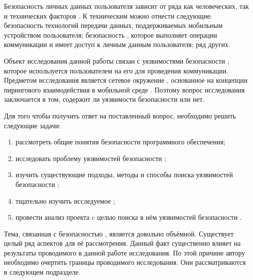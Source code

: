%
Безопасность личных данных пользователя зависит от ряда как человеческих, так и технических факторов .
%
К техническим можно отнести следующие: безопасность технологий передачи данных, поддерживаемых мобильным устройством пользователя; безопасность , которое выполняет операции коммуникации и имеет доступ к личным данным пользователя; ряд других.

%
Объект исследования данной работы связан с уязвимостями безопасности , которое используется пользователем на его  для проведения коммуникации. 
%
Предметом исследования является сетевое окружение , основанное на концепции пирингового взаимодействия  в мобильной среде .
%
Поэтому вопрос исследования заключается в том, содержит ли  уязвимости безопасности или нет.

%
Для того чтобы получить ответ на поставленный вопрос, необходимо решить следующие задачи:
\begin{enumerate}
	\item рассмотреть общие понятия безопасности программного обеспечения;
	\item исследовать проблему уязвимостей безопасности ;
	\item изучить существующие подходы, методы и способы поиска уязвимостей безопасности 
		;
	\item тщательно изучить исследуемое  ;
	\item провести анализ проекта  c целью поиска в нём уязвимостей безопасности 
		.
\end{enumerate}

%
Тема, связанная с безопасностью , является довольно объёмной.
%
Существует целый ряд аспектов для её рассмотрения. 
\Sentnce
Данный факт существенно влияет на результаты проводимого в данной работе исследования.
%
По этой причине автору необходимо очертить границы проводимого исследования. 
%
Они рассматриваются в следующем подразделе. 

